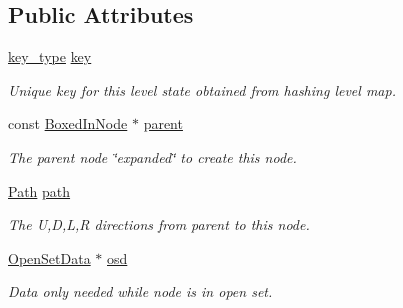 \subsection*{Public Attributes}
\begin{DoxyCompactItemize}
\item 
\hypertarget{classboxedin_1_1BoxedInNode_a3486e9bbd67ba0517f0e69f9aafc5d9d}{\hyperlink{namespaceboxedin_ac4dc3ff36b9cef0b4c5cc1a96bfc0abd}{key\+\_\+type} \hyperlink{classboxedin_1_1BoxedInNode_a3486e9bbd67ba0517f0e69f9aafc5d9d}{key}}\label{classboxedin_1_1BoxedInNode_a3486e9bbd67ba0517f0e69f9aafc5d9d}

\begin{DoxyCompactList}\small\item\em Unique key for this level state obtained from hashing level map. \end{DoxyCompactList}\item 
\hypertarget{classboxedin_1_1BoxedInNode_ad7999d3cf6772f89aeeace570c36f89c}{const \hyperlink{classboxedin_1_1BoxedInNode}{Boxed\+In\+Node} $\ast$ \hyperlink{classboxedin_1_1BoxedInNode_ad7999d3cf6772f89aeeace570c36f89c}{parent}}\label{classboxedin_1_1BoxedInNode_ad7999d3cf6772f89aeeace570c36f89c}

\begin{DoxyCompactList}\small\item\em The parent node \char`\"{}expanded\char`\"{} to create this node. \end{DoxyCompactList}\item 
\hypertarget{classboxedin_1_1BoxedInNode_a8dd91a0bd3d6f7a51a3898b318781371}{\hyperlink{namespaceboxedin_ab79d3e8d943aa2875e3adb42b8917ff7}{Path} \hyperlink{classboxedin_1_1BoxedInNode_a8dd91a0bd3d6f7a51a3898b318781371}{path}}\label{classboxedin_1_1BoxedInNode_a8dd91a0bd3d6f7a51a3898b318781371}

\begin{DoxyCompactList}\small\item\em The U,D,L,R directions from parent to this node. \end{DoxyCompactList}\item 
\hypertarget{classboxedin_1_1BoxedInNode_a611474769c7702558251004f139e9c98}{\hyperlink{classboxedin_1_1OpenSetData}{Open\+Set\+Data} $\ast$ \hyperlink{classboxedin_1_1BoxedInNode_a611474769c7702558251004f139e9c98}{osd}}\label{classboxedin_1_1BoxedInNode_a611474769c7702558251004f139e9c98}

\begin{DoxyCompactList}\small\item\em Data only needed while node is in open set. \end{DoxyCompactList}\end{DoxyCompactItemize}
